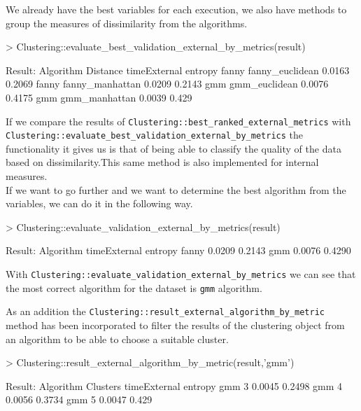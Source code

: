 We already have the best variables for each execution, we also have methods to group the measures of dissimilarity from the algorithms.

\begin{Schunk}
\begin{Sinput}
> Clustering::evaluate_best_validation_external_by_metrics(result)
\end{Sinput}
\begin{Soutput}
Result:
Algorithm     Distance      timeExternal entropy
 fanny     fanny_euclidean      0.0163   0.2069
 fanny     fanny_manhattan      0.0209   0.2143
  gmm       gmm_euclidean       0.0076   0.4175
  gmm       gmm_manhattan       0.0039   0.429
\end{Soutput}
\end{Schunk}

If we compare the results of \texttt{Clustering::best\_ranked\_external\_metrics} with\\ \texttt{Clustering::evaluate\_best\_validation\_external\_by\_metrics} the functionality it gives us is that of being able to classify the quality of the data based on dissimilarity.This same method is also implemented for internal measures.
\\
If we want to go further and we want to determine the best algorithm from the variables, we can do it in the following way.

\begin{Schunk}
\begin{Sinput}
> Clustering::evaluate_validation_external_by_metrics(result)
\end{Sinput}
\begin{Soutput}
Result:
  Algorithm timeExternal entropy
    fanny     0.0209     0.2143
    gmm       0.0076     0.4290
\end{Soutput}
\end{Schunk}

With \texttt{Clustering::evaluate\_validation\_external\_by\_metrics} we can see that the most correct algorithm for the dataset is \texttt{gmm} algorithm.

As an addition the \texttt{Clustering::result\_external\_algorithm\_by\_metric} method has been incorporated to filter the results of the clustering object from an algorithm to be able to choose a suitable cluster.

\begin{Schunk}
\begin{Sinput}
> Clustering::result_external_algorithm_by_metric(result,'gmm')
\end{Sinput}
\begin{Soutput}
Result:
Algorithm Clusters timeExternal entropy
    gmm      3       0.0045      0.2498
    gmm      4       0.0056      0.3734
    gmm      5       0.0047      0.429
\end{Soutput}
\end{Schunk}


